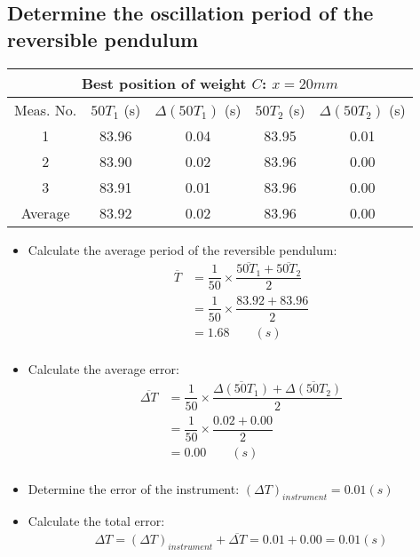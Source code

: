 \documentclass[12pt, a4paper]{article}
\newcommand{\mul}{\times}
\newcommand{\avg}{\overline}
\newcommand{\Dt}{\Delta}
\newcommand{\hii}{\subsection}
\begin{document}
    \hii{Determine the oscillation period of the reversible pendulum}
        \begin{center}
            \begin{tabular}{|c|c|c|c|c|}
                \hline
                \multicolumn{5}{|c|}{Best position of weight $C$: $x = 20 mm$} \\
                \hline
                Meas. No. & $50T_{1}$ (s) & $\Dt (50T_{1})$ (s) & $50T_{2}$ (s) & $\Dt (50T_{2})$ (s) \\
                \hline
                1       & 83.96 & 0.04 & 83.95 & 0.01 \\
                \hline
                2       & 83.90 & 0.02 & 83.96 & 0.00 \\
                \hline
                3       & 83.91 & 0.01 & 83.96 & 0.00 \\
                \hline
                Average & 83.92 & 0.02 & 83.96 & 0.00 \\
                \hline
            \end{tabular}
        \end{center}
        \begin{itemize}
            \item Calculate the average period of the reversible pendulum:
                \begin{align*}
                    \avg{T} & = \dfrac{1}{50} \mul \dfrac{\avg{50T_{1}} + \avg{50T_{2}}}{2} \\
                    & = \dfrac{1}{50} \mul \dfrac{83.92 + 83.96}{2} \\
                    & = 1.68 \qquad (s) \\
                \end{align*}
            \item Calculate the average error:
                \begin{align*}
                    \avg{\Dt T} & = \dfrac{1}{50} \mul \dfrac{\avg{\Dt (50T_{1})} + \avg{\Dt (50T_{2})}}{2} \\
                    & = \dfrac{1}{50} \mul \dfrac{0.02 + 0.00}{2} \\
                    & = 0.00 \qquad (s) \\
                \end{align*}
            \item Determine the error of the instrument: $(\Dt T)_{instrument} = 0.01 (s)$
            \item Calculate the total error:
                \begin{align*}
                    \Dt T = (\Dt T)_{instrument} + \avg{\Dt T} = 0.01 + 0.00 = 0.01 (s)
                \end{align*}
        \end{itemize}
       
\end{document}
